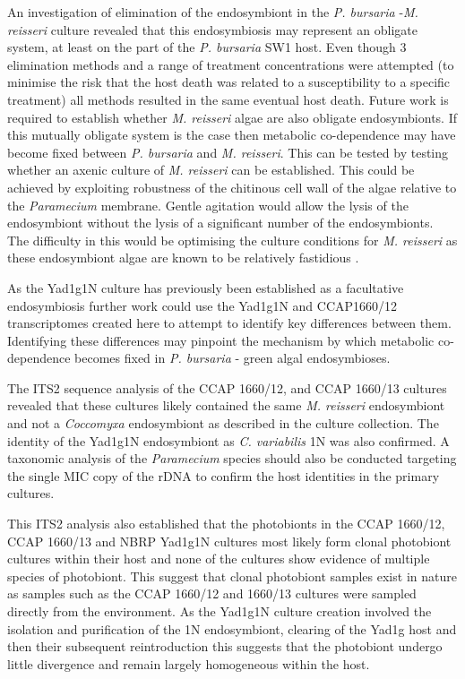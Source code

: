 
An investigation of elimination of the endosymbiont in the \textit{P. bursaria}
-\textit{M. reisseri} culture revealed that this endosymbiosis
may represent an obligate system, at least on the part of the
\textit{P. bursaria} SW1 host.  Even though 3 elimination methods and
a range of treatment concentrations were attempted (to minimise the 
risk that the host death was related to a susceptibility to a 
specific treatment) all methods resulted in the same eventual host death.
Future work is required to establish whether \textit{M. reisseri}
algae are also obligate endosymbionts.  If this mutually obligate system is 
the case then metabolic co-dependence may have become fixed between
\textit{P. bursaria} and \textit{M. reisseri}.
This can be tested by testing whether an axenic culture of 
\textit{M. reisseri} can be established. 
This could be achieved
by exploiting robustness of the chitinous cell wall
of the algae relative to the \textit{Paramecium} membrane. Gentle agitation
would allow the lysis of the endosymbiont without the lysis of a significant
number of the endosymbionts.  The difficulty in this would be optimising
the culture conditions for \textit{M. reisseri} 
as these endosymbiont algae are known to be relatively fastidious \citep{Hoshina2009}.

As the Yad1g1N culture has previously been established as
a facultative endosymbiosis 
further work could use the Yad1g1N and CCAP1660/12 
transcriptomes created here to attempt to identify key differences 
between them.  Identifying these differences may pinpoint
the mechanism by which metabolic co-dependence becomes fixed in \textit{P. bursaria}
- green algal endosymbioses.

The ITS2 sequence analysis of the CCAP 1660/12,
and CCAP 1660/13 cultures revealed that these cultures likely contained 
the same \textit{M. reisseri} endosymbiont and not a \textit{Coccomyxa}
endosymbiont as described in the culture collection. 
The identity of the Yad1g1N endosymbiont
as \textit{C. variabilis} 1N was also confirmed.
A taxonomic analysis of the \textit{Paramecium} species
should also be conducted targeting the single MIC copy of the rDNA
to confirm the host identities in the primary cultures. 

This ITS2 analysis also established that 
the photobionts in the CCAP 1660/12, CCAP 1660/13
and NBRP Yad1g1N cultures most likely form
clonal photobiont cultures within their host and none
of the cultures show evidence of multiple species of photobiont.
This suggest that clonal photobiont samples exist
in nature as samples such as the CCAP 1660/12 and 1660/13
cultures were sampled directly from the environment.  
As the Yad1g1N culture creation involved
the isolation and purification of the 1N endosymbiont, 
clearing of the Yad1g host and then their subsequent
reintroduction this suggests that the photobiont
undergo little divergence and remain largely
homogeneous within the host.

